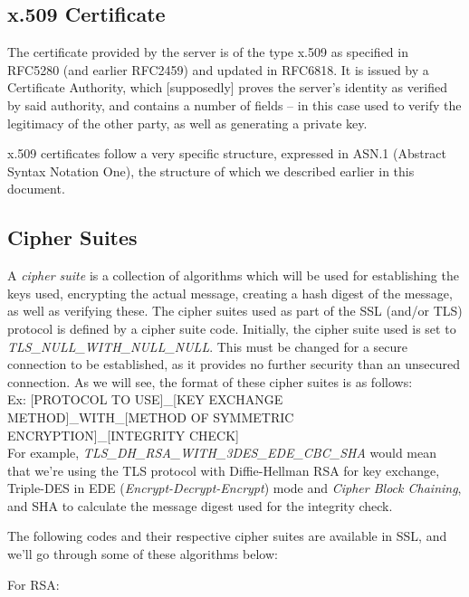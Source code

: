 \subsection{x.509 Certificate}
The certificate provided by the server is of the type x.509 as specified in RFC5280 (and earlier RFC2459) and updated in RFC6818. It is issued by a Certificate Authority, which [supposedly] proves the server's identity as verified by said authority, and contains a number of fields -- in this case used to verify the legitimacy of the other party, as well as generating a private key.

x.509 certificates follow a very specific structure, expressed in ASN.1 (Abstract Syntax Notation One), the structure of which we described earlier in this document.

\subsection{Cipher Suites}
A \textit{cipher suite} is a collection of algorithms which will be used for establishing the keys used, encrypting the actual message, creating a hash digest of the message, as well as verifying these. The cipher suites used as part of the SSL (and/or TLS) protocol is defined by a cipher suite code. Initially, the cipher suite used is set to \textit{TLS\_NULL\_WITH\_NULL\_NULL}. This must be changed for a secure connection to be established, as it provides no further security than an unsecured connection. As we will see, the format of these cipher suites is as follows: \\
Ex: [PROTOCOL TO USE]\_[KEY EXCHANGE METHOD]\_WITH\_[METHOD OF SYMMETRIC ENCRYPTION]\_[INTEGRITY CHECK] \\
For example, \textit{TLS\_DH\_RSA\_WITH\_3DES\_EDE\_CBC\_SHA} would mean that we're using the TLS protocol with Diffie-Hellman RSA for key exchange, Triple-DES in EDE (\textit{Encrypt-Decrypt-Encrypt}) mode and \textit{Cipher Block Chaining}, and SHA to calculate the message digest used for the integrity check.

The following codes and their respective cipher suites are available in SSL, and we'll go through some of these algorithms below:

For RSA:

